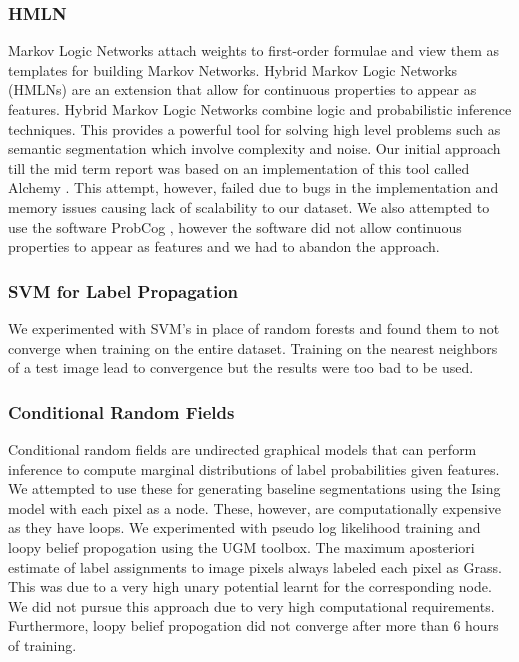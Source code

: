 \documentclass{article} %
\begin{document}
\subsubsection{HMLN}
Markov Logic Networks \cite{Domingos06unifyinglogical} \cite{Richardson06markovlogic} attach weights to first-order formulae and view them as templates for building Markov Networks. Hybrid Markov Logic Networks (HMLNs)\cite{Wang_hybridmarkov} are an extension that allow for continuous properties to appear as features. Hybrid Markov Logic Networks combine logic and probabilistic inference techniques. This provides a powerful tool for solving high level problems such as semantic segmentation which involve complexity and noise. Our initial approach till the mid term report was based on an implementation of this tool called Alchemy \cite{alchemy}. This attempt, however, failed due to bugs in the implementation and memory issues causing lack of scalability to our dataset. We also attempted to use the software ProbCog \cite{conf/ifiptm/NoorianMF11}, however the software did not allow continuous properties to appear as features and we had to abandon the approach. 

\subsubsection{SVM for Label Propagation}
We experimented with SVM's in place of random forests and found them to not converge when training on the entire dataset. Training on the nearest neighbors of a test image lead to convergence but the results were too bad to be used.

\subsubsection{Conditional Random Fields}
Conditional random fields \cite{lafferty2001conditional} are undirected graphical models that can perform inference to compute marginal distributions of label probabilities given features.
We attempted to use these for generating baseline segmentations using the Ising model with each pixel as a node.
These, however, are computationally expensive as they have loops.
We experimented with pseudo log likelihood training and loopy belief propogation using the UGM toolbox\cite{UGMSoftware}.
The maximum aposteriori estimate of label assignments to image pixels always labeled each pixel as Grass.
This was due to a very high unary potential learnt for the corresponding node. 
We did not pursue this approach due to very high computational requirements.
Furthermore, loopy belief propogation did not converge after more than 6 hours of training.
\end{document}
